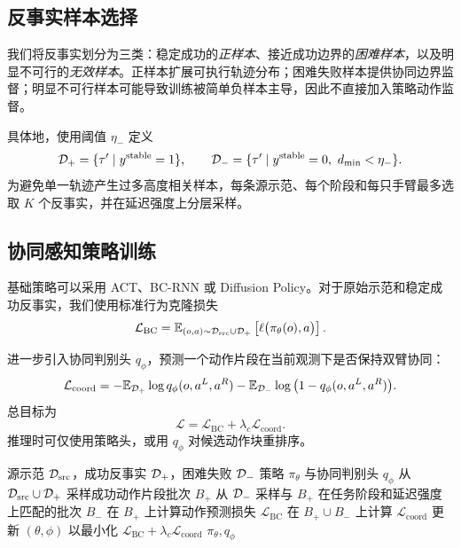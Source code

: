 \subsection{反事实样本选择}

我们将反事实划分为三类：稳定成功的\emph{正样本}、接近成功边界的\emph{困难样本}，以及明显不可行的\emph{无效样本}。正样本扩展可执行轨迹分布；困难失败样本提供协同边界监督；明显不可行样本可能导致训练被简单负样本主导，因此不直接加入策略动作监督。

具体地，使用阈值 $\eta_{-}$ 定义
\begin{equation}
\Dpos=\{\tau'\mid y^{\mathrm{stable}}=1\},\qquad
\Dneg=\{\tau'\mid y^{\mathrm{stable}}=0,\ d_{\min}<\eta_{-}\}.
\end{equation}
为避免单一轨迹产生过多高度相关样本，每条源示范、每个阶段和每只手臂最多选取 $K$ 个反事实，并在延迟强度上分层采样。

\subsection{协同感知策略训练}

基础策略可以采用 ACT、BC-RNN 或 Diffusion Policy。对于原始示范和稳定成功反事实，我们使用标准行为克隆损失
\begin{equation}
\mathcal{L}_{\mathrm{BC}}=
\mathbb{E}_{(o,a)\sim\mathcal{D}_{\mathrm{src}}\cup\mathcal{D}_{+}}
\left[\ell\big(\pi_\theta(o),a\big)\right].
\end{equation}

进一步引入协同判别头 $q_\phi$，预测一个动作片段在当前观测下是否保持双臂协同：
\begin{equation}
\mathcal{L}_{\mathrm{coord}}=
-\mathbb{E}_{\mathcal{D}_{+}}\log q_\phi(o,a^{L},a^{R})
-\mathbb{E}_{\mathcal{D}_{-}}\log\big(1-q_\phi(o,a^{L},a^{R})\big).
\end{equation}
总目标为
\begin{equation}
\mathcal{L}=\mathcal{L}_{\mathrm{BC}}+\lambda_{c}\mathcal{L}_{\mathrm{coord}}.
\end{equation}
推理时可仅使用策略头，或用 $q_\phi$ 对候选动作块重排序。

\begin{algorithm}[t]
\caption{协同感知策略训练}
\label{alg:training}
\begin{algorithmic}[1]
\Require 源示范 $\mathcal{D}_{\mathrm{src}}$，成功反事实 $\mathcal{D}_{+}$，困难失败 $\mathcal{D}_{-}$
\Ensure 策略 $\pi_\theta$ 与协同判别头 $q_\phi$
    \State 从 $\mathcal{D}_{\mathrm{src}}\cup\mathcal{D}_{+}$ 采样成功动作片段批次 $B_{+}$
    \State 从 $\mathcal{D}_{-}$ 采样与 $B_{+}$ 在任务阶段和延迟强度上匹配的批次 $B_{-}$
    \State 在 $B_{+}$ 上计算动作预测损失 $\mathcal{L}_{\mathrm{BC}}$
    \State 在 $B_{+}\cup B_{-}$ 上计算 $\mathcal{L}_{\mathrm{coord}}$
    \State 更新 $(\theta,\phi)$ 以最小化 $\mathcal{L}_{\mathrm{BC}}+\lambda_c\mathcal{L}_{\mathrm{coord}}$
\EndFor
\State \Return $\pi_\theta,q_\phi$
\end{algorithmic}
\end{algorithm}

